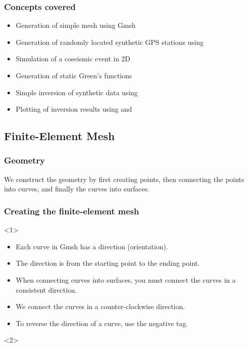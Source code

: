 \documentclass{beamer}
\begin{document}
\begin{frame}
  \frametitle{Concepts covered}
  \summary{}

  \begin{itemize}
  \item Generation of simple mesh using Gmsh
  \item Generation of randomly located synthetic GPS stations using 
  \item Simulation of a coseismic event in 2D
  \item Generation of static Green's functions
  \item Simple inversion of synthetic data using 
  \item Plotting of inversion results using  and 
  \end{itemize}
  
\end{frame}

\subsection{Finite-Element Mesh}

\begin{frame}
  \frametitle{Geometry}
  \summary{}

  We construct the geometry by first creating points, then connecting the points into curves, and finally the curves into surfaces.
  
  
\end{frame}


\begin{frame}
  \frametitle{Creating the finite-element mesh}
  \summary{}

  \begin{onlyenv}<1>
    \begin{itemize}
    \item Each curve in Gmsh has a direction (orientation).
    \item The direction is from the starting point to the ending point.
    \item When connecting curves into surfaces, you must connect the curves in a consistent direction.
    \item We connect the curves in a counter-clockwise direction.
    \item To reverse the direction of a curve, use the negative tag.
    \end{itemize}
  \end{onlyenv}
  \begin{onlyenv}<2>
  \end{onlyenv}
  
\end{frame}
\end{document}
